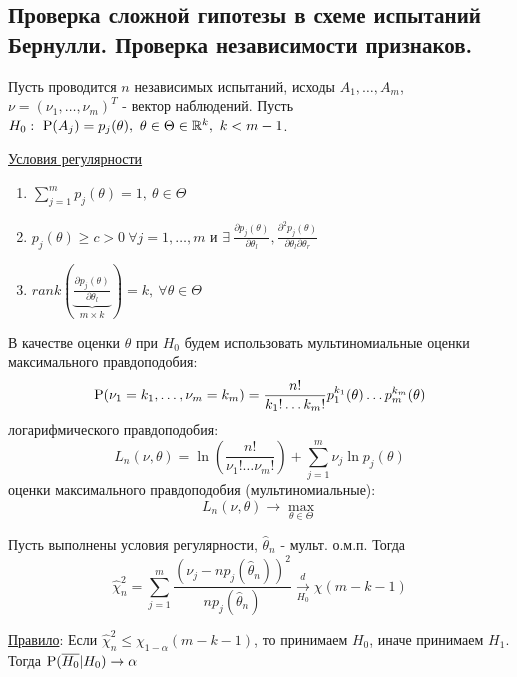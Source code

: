 \subsection{Проверка сложной гипотезы в схеме испытаний Бернулли. Проверка независимости признаков.}
Пусть проводится $n$ независимых испытаний, исходы
$A_1,\ldots,A_m$, $\nu=(\nu_1,\ldots,\nu_m)^T$ - вектор наблюдений.
Пусть $H_0:\ \P(A_j)=p_j(\theta),\ \theta\in\Theta\in\R^k,\ k<m-1$.

\underline{Условия регулярности}
\begin{enumerate}
    \item $\sum_{j=1}^mp_j(\theta)=1,\ \theta\in\Theta$
    \item $p_j(\theta)\geq c>0\ \forall j=1,\ldots,m$ и $\exists\ \frac{\partial p_j(\theta)}{\partial \theta_l},\frac{\partial^2p_j(\theta)}{\partial\theta_l\partial\theta_r}$
    \item $rank(\underbrace{\frac{\partial p_j(\theta)}{\partial \theta_l}}_{\text{$m\times k$}})=k,\ \forall\theta\in\Theta$
\end{enumerate}
В качестве оценки $\theta$ при $H_0$ будем использовать мультиномиальные
оценки максимального правдоподобия:
\[\P(\nu_1=k_1,\ldots,\nu_m=k_m)=\frac{n!}{k_1!\ldots k_m!}p_1^{k_1}(\theta)\ldots p_m^{k_m}(\theta)\]
логарифмического правдоподобия:
\[L_n(\nu,\theta)=\ln\left(\frac{n!}{\nu_1!\ldots \nu_m!}\right)+\sum_{j=1}^m\nu_j\ln p_j(\theta)\]
оценки максимального правдоподобия (мультиномиальные):
\[L_n(\nu,\theta)\rightarrow\max_{\theta\in\Theta}\]
\begin{theorem*}
Пусть выполнены условия регулярности, $\widehat{\theta}_n$ - мульт. о.м.п. Тогда
\[ \widehat{\chi}_n^2=\sum_{j=1}^m\frac{(\nu_j-np_j(\widehat{\theta}_n))^2}{np_j(\widehat{\theta}_n)}\xrightarrow[H_0]{d}\chi(m-k-1) \]

\underline{Правило}: Если $\widehat{\chi}_n^2\leq\chi_{1-\alpha}(m-k-1)$, то принимаем $H_0$, иначе принимаем $H_1$.
Тогда $\P(\overline{H_0}\vert H_0)\rightarrow\alpha$

\end{theorem*}
